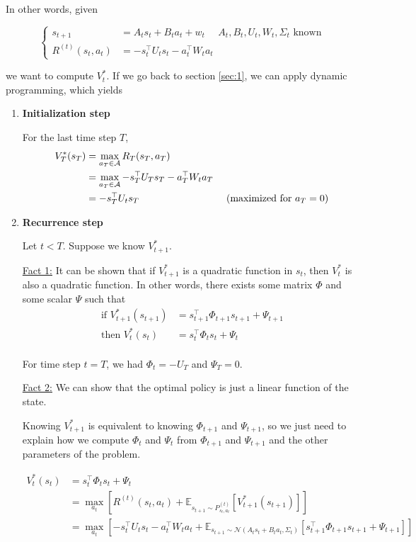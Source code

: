 \documentclass{article}
\begin{document}
In other words, given

\[ \begin{cases}
	 s_{t+1} &= A_t s_t + B_t a_t + w_t  \ \ \ \ \ \ A_t, B_t, U_t, W_t, \Sigma_t \text{ known }\\
	 R^{(t)}(s_t, a_t)& = - s_t^\top U_t s_t - a_t^\top W_t a_t 
\end{cases} \]


we want to compute $ V_t^* $. If we go back to section \ref{sec:1}, we can apply dynamic programming, which yields

\begin{enumerate}
	\item \textbf{Initialization step}
	
	For the last time step $ T $, 
	\begin{align*}
		V_T^{*} (s_T) &= \max_{a_T \in \mathcal{A}} R_T(s_T, a_T) \\
		&= \max_{a_T \in \mathcal{A}} - s_T^\top U_T s_T - a_T^\top W_t a_T\\
		&= - s_T^\top U_t s_T & \text{ (maximized for $ a_T = 0 $)}
	\end{align*}
	\item \textbf{Recurrence step} 
	
	Let $ t < T $. Suppose we know $ V^*_{t+1} $.
	
	\underline{Fact 1:} It can be shown that if $ V_{t+1}^* $ is a quadratic function in $ s_t $, then $ V_{t}^* $ is also a quadratic function. In other words, there exists some matrix $ \Phi $ and some scalar $ \Psi $ such that
	\begin{align*}
		 \text{if } V_{t+1}^*(s_{t+1}) &= s_{t+1}^\top \Phi_{t+1} s_{t+1} + \Psi_{t+1}\\
		 \text{then } V_{t}^* (s_t) &= s_{t}^\top \Phi_{t} s_{t} + \Psi_{t}\\
	\end{align*}
	
	For time step $ t = T $, we had $ \Phi_t = - U_T $ and $ \Psi_T = 0 $.
	
	\underline{Fact 2:} We can show that the optimal policy is just a linear function of the state.
	
	Knowing $ V^*_{t+1} $ is equivalent to knowing $ \Phi_{t+1} $ and $ \Psi_{t+1} $, so we just need to explain how we compute $ \Phi_t $ and $ \Psi_t $  from $ \Phi_{t+1} $ and $ \Psi_{t+1} $  and the other parameters of the problem. 
	
	\begin{align*}
		V_{t}^*(s_t) &= s_{t}^\top \Phi_{t} s_{t} + \Psi_{t}\\
		&= \max_{a_t} \left[R^{(t)}(s_t, a_t) + \mathbb{E}_{s_{t+1} \sim P^{(t)}_{s_t, a_t} } [ V_{t+1}^* (s_{t+1} ) ] \right]\\
		&= \max_{a_t} \left[- s_t^\top U_t s_t - a_t^\top W_t a_t  + \mathbb{E}_{s_{t+1} \sim \mathcal{N}\left(A_t s_t + B_t a_t, \Sigma_t \right) } [ s_{t+1}^\top \Phi_{t+1} s_{t+1} + \Psi_{t+1} ] \right]
	\end{align*}
	 

\end{enumerate}
\end{document}
